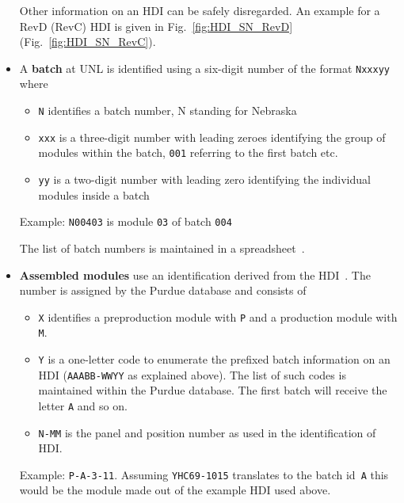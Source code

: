 \documentclass[12pt]{unlsilabsop}
\begin{document}
\begin{itemize}
    Other information on an HDI can be safely disregarded. An example for a RevD (RevC) HDI is given in Fig.~\ref{fig:HDI_SN_RevD} (Fig.~\ref{fig:HDI_SN_RevC}).

    \item A \textbf{batch} at UNL is identified using a six-digit number of the format \texttt{Nxxxyy} where
        \begin{itemize}
        \item \texttt{N} identifies a batch number, N standing for Nebraska
        \item \texttt{xxx} is a three-digit number with leading zeroes identifying the group of modules within the batch, \texttt{001} referring to the first batch etc.
        \item \texttt{yy} is a two-digit number with leading zero identifying the individual modules inside a batch
        \end{itemize}
    Example: \texttt{N00403} is module \texttt{03} of batch \texttt{004}

    The list of batch numbers is maintained in a spreadsheet~\cite{UNLlist}.

    \item \textbf{Assembled modules} use an identification derived from the HDI~\cite{HDInaming}. The number is assigned by the Purdue database and consists of
        \begin{itemize}
        \item \texttt{X} identifies a preproduction module with \texttt{P} and a production module with \texttt{M}.
        \item \texttt{Y} is a one-letter code to enumerate the prefixed batch information on an HDI (\texttt{AAABB-WWYY} as explained above). The list of such codes is maintained within the Purdue database. The first batch will receive the letter \texttt{A} and so on.
        \item \texttt{N-MM} is the panel and position number as used in the identification of HDI.
        \end{itemize}
    Example: \texttt{P-A-3-11}. Assuming \texttt{YHC69-1015} translates to the batch id~\texttt{A} this would be the module made out of the example HDI used above.
\end{itemize}
\end{document}
